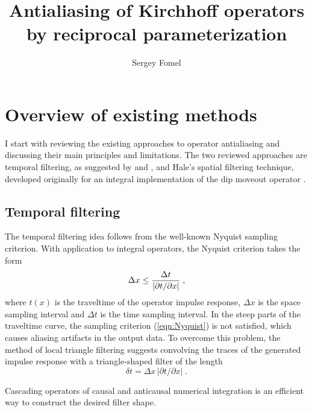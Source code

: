 \title{Antialiasing of Kirchhoff operators by reciprocal
  parameterization}

\author{Sergey Fomel}
\maketitle



\section{Overview of existing methods}

I start with reviewing the existing approaches to operator
antialiasing and discussing their main principles and limitations. The
two reviewed approaches are temporal filtering, as suggested by
\cite{GPR40-05-05650572} and \cite{SEG-1994-1282}, and Hale's spatial
filtering technique, developed originally for an integral
implementation of the dip moveout operator \cite[]{GEO56-06-07950805}.

\subsection{Temporal filtering}
The temporal filtering idea follows
from the well-known Nyquist sampling criterion. With application to
integral operators, the Nyquist criterion takes the form
\begin{equation}
\Delta x \leq {{\Delta t} \over {|\partial t / \partial x|}}\;,
\label{eqn:Nyquist}
\end{equation}
where $t(x)$ is the traveltime of the operator impulse response,
$\Delta x$ is the space sampling interval and $\Delta t$ is the time
sampling interval. In the steep parts of the traveltime curve, the
sampling criterion (\ref{eqn:Nyquist}) is not satisfied, which causes
aliasing artifacts in the output data. To overcome this problem, the
method of local triangle filtering
\cite[]{Claerbout.sep.73.371,SEG-1994-1282} suggests convolving the
traces of the generated impulse response with a triangle-shaped filter
of the length
\begin{equation}
\delta t = \Delta x\,|\partial t / \partial x|\;.
\label{eqn:dt}
\end{equation}


Cascading operators of causal and anticausal numerical integration is
an efficient way to construct the desired filter shape.

